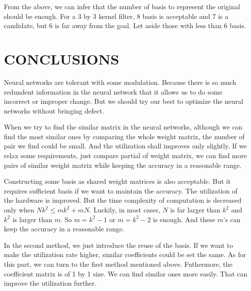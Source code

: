 \documentclass[letterpaper, 10 pt, conference]{ieeeconf}  %
\begin{document}
From the above, we can infer that the number of basis to represent the original should be enough. For a 3 by 3 kernel filter, 8 basis is acceptable and 7 is a candidate, but 6 is far away from the goal. Let aside those with less than 6 basis.
\section{CONCLUSIONS}
Neural networks are tolerant with some modulation. Because there is so much redundent information
in the neural network that it allows us to do some incorrect or improper change. But we should try our best to optimize the neural networks without bringing defect. 

When we try to find the similar matrix in the neural networks, although we can find the most similar ones by comparing the whole weight matrix, the number of pair we find could be small. And the utilization shall improves only slightly. If we relax some requirements, just compare partial of weight matrix, we can find more pairs of similar weight matrix while keeping the accuracy in a reasonable range.

Constructing some basis as shared weight matrices is also acceptable. But it requires sufficient basis if we want to maintain the accuracy. The utilization of the hardware is improved. But the time complexity of computation is decreased only when $Nk^2 \leq mk^2+mN$. Luckily, in most cases, $N$ is far larger than $k^2$ and $k^2$ is larger than $m$. So $m = k^2-1$ or $m = k^2 - 2$ is enough. And these $m$'s can keep the accuracy in a reasonable range.

In the second method, we just introduce the reuse of the basis. If we want to make the utilization rate higher, similar coefficients could be set the same. As for this part, we can turn to the first method mentioned above. Futhermore, the coefficient matrix is of 1 by 1 size. We can find similar ones more easily. That can improve the utilization further.
\addtolength{\textheight}{-12cm}   %

\end{document}
